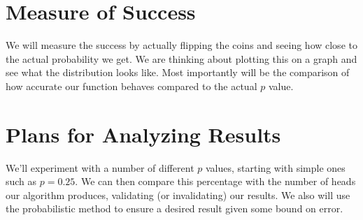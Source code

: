 \documentclass{article}
\begin{document}
\section{Measure of Success}

We will measure the success by actually flipping the coins and seeing how 
close to the actual probability we get. We are thinking about plotting this on
a graph and see what the distribution looks like. Most importantly will be the
comparison of how accurate our function behaves compared to the actual $p$ value.


\section{Plans for Analyzing Results}

We'll experiment with a number of different $p$ values, starting with simple ones such as $p = 0.25$. 
We can then compare this percentage with the number of heads our algorithm produces, validating (or invalidating) 
our results. We also will use the probabilistic method to ensure a desired result given some bound on error. 
\end{document}
